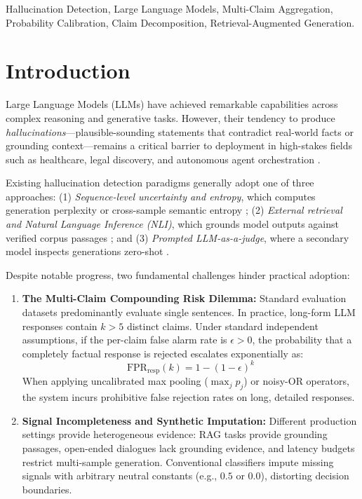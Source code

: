 \documentclass[conference]{IEEEtran}
\begin{document}
\begin{IEEEkeywords}
Hallucination Detection, Large Language Models, Multi-Claim Aggregation, Probability Calibration, Claim Decomposition, Retrieval-Augmented Generation.
\end{IEEEkeywords}

\section{Introduction}
Large Language Models (LLMs) have achieved remarkable capabilities across complex reasoning and generative tasks. 
However, their tendency to produce \textit{hallucinations}---plausible-sounding statements that contradict real-world facts or grounding context---remains a critical barrier to deployment in high-stakes fields such as healthcare, legal discovery, and autonomous agent orchestration \cite{b12_selfcheck, b17_ragtruth}.

Existing hallucination detection paradigms generally adopt one of three approaches:
(1) \textit{Sequence-level uncertainty and entropy}, which computes generation perplexity or cross-sample semantic entropy \cite{b12_selfcheck, b21_qwen};
(2) \textit{External retrieval and Natural Language Inference (NLI)}, which grounds model outputs against verified corpus passages \cite{b17_ragtruth, b20_deberta}; and
(3) \textit{Prompted LLM-as-a-judge}, where a secondary model inspects generations zero-shot \cite{b13_halueval}.

Despite notable progress, two fundamental challenges hinder practical adoption:
\begin{enumerate}
    \item \textbf{The Multi-Claim Compounding Risk Dilemma:} 
    Standard evaluation datasets predominantly evaluate single sentences. In practice, long-form LLM responses contain $k > 5$ distinct claims. Under standard independent assumptions, if the per-claim false alarm rate is $\epsilon > 0$, the probability that a completely factual response is rejected escalates exponentially as:
    \begin{equation}
        \text{FPR}_{\text{resp}}(k) = 1 - (1 - \epsilon)^k
    \end{equation}
    When applying uncalibrated max pooling ($\max_j p_j$) or noisy-OR operators, the system incurs prohibitive false rejection rates on long, detailed responses.
    \item \textbf{Signal Incompleteness and Synthetic Imputation:}
    Different production settings provide heterogeneous evidence: RAG tasks provide grounding passages, open-ended dialogues lack grounding evidence, and latency budgets restrict multi-sample generation. Conventional classifiers impute missing signals with arbitrary neutral constants (e.g., $0.5$ or $0.0$), distorting decision boundaries.
\end{enumerate}
\end{document}

